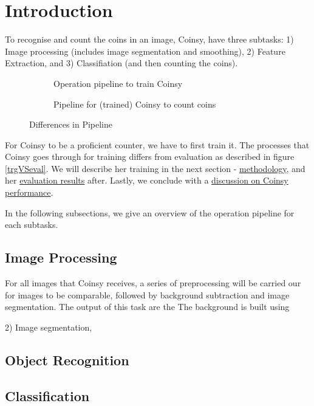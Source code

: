 \documentclass[main.tex]{subfiles}
\begin{document}
\section[intro]{Introduction\hypertarget{sec:intro}{}}


\par
To recognise and count the coins in an image, Coinsy, have three subtasks: 1) Image processing (includes image segmentation and smoothing), 2) Feature Extraction, and 3) Classifiation (and then counting the coins).

\begin{figure}[!t]
  \begin{subfigure}[!b]{0.5\textwidth}
    \centering
    \resizebox{\linewidth}{!}{}
    \caption{Operation pipeline to train Coinsy} \label{trgPipe}
  \end{subfigure}
  \begin{subfigure}[!b]{0.5\textwidth}
    \centering
    \resizebox{\linewidth}{!}{}
    \caption{Pipeline for (trained) Coinsy to count coins} \label{evalPipe}
  \end{subfigure}
  \caption{Differences in Pipeline} \label{trgVSeval}
\end{figure}


For Coinsy to be a proficient counter, we have to first train it. The processes that Coinsy goes through for training differs from evaluation as described in figure \autoref{trgVSeval}. We will describe her training in the next section - \hyperlink{method}{methodology}, and her \hyperlink{resut}{evaluation results} after. Lastly, we conclude with a \hyperlink{discussion}{discussion on Coinsy performance}.


In the following subsections, we give an overview of the operation pipeline for each subtasks.


\subsection{Image Processing}
For all images that Coinsy receives, a series of preprocessing will be carried our for images to be comparable, followed by background subtraction and image segmentation. The output of this task are the The background is built using

2) Image segmentation,


\subsection{Object Recognition}


\subsection{Classification}
\end{document}

